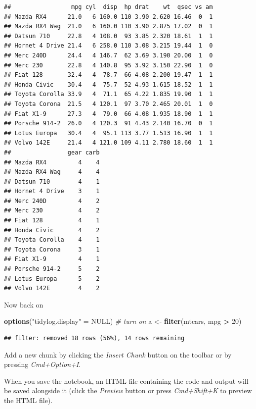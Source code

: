 \documentclass[
]{book}
\newenvironment{Shaded}{\begin{snugshade}}{\end{snugshade}}
\newcommand{\CommentTok}[1]{\textcolor[rgb]{0.56,0.35,0.01}{\textit{#1}}}
\newcommand{\DecValTok}[1]{\textcolor[rgb]{0.00,0.00,0.81}{#1}}
\newcommand{\KeywordTok}[1]{\textcolor[rgb]{0.13,0.29,0.53}{\textbf{#1}}}
\newcommand{\NormalTok}[1]{#1}
\newcommand{\OperatorTok}[1]{\textcolor[rgb]{0.81,0.36,0.00}{\textbf{#1}}}
\newcommand{\OtherTok}[1]{\textcolor[rgb]{0.56,0.35,0.01}{#1}}
\newcommand{\StringTok}[1]{\textcolor[rgb]{0.31,0.60,0.02}{#1}}
\begin{document}
\begin{verbatim}
##                 mpg cyl  disp  hp drat    wt  qsec vs am
## Mazda RX4      21.0   6 160.0 110 3.90 2.620 16.46  0  1
## Mazda RX4 Wag  21.0   6 160.0 110 3.90 2.875 17.02  0  1
## Datsun 710     22.8   4 108.0  93 3.85 2.320 18.61  1  1
## Hornet 4 Drive 21.4   6 258.0 110 3.08 3.215 19.44  1  0
## Merc 240D      24.4   4 146.7  62 3.69 3.190 20.00  1  0
## Merc 230       22.8   4 140.8  95 3.92 3.150 22.90  1  0
## Fiat 128       32.4   4  78.7  66 4.08 2.200 19.47  1  1
## Honda Civic    30.4   4  75.7  52 4.93 1.615 18.52  1  1
## Toyota Corolla 33.9   4  71.1  65 4.22 1.835 19.90  1  1
## Toyota Corona  21.5   4 120.1  97 3.70 2.465 20.01  1  0
## Fiat X1-9      27.3   4  79.0  66 4.08 1.935 18.90  1  1
## Porsche 914-2  26.0   4 120.3  91 4.43 2.140 16.70  0  1
## Lotus Europa   30.4   4  95.1 113 3.77 1.513 16.90  1  1
## Volvo 142E     21.4   4 121.0 109 4.11 2.780 18.60  1  1
##                gear carb
## Mazda RX4         4    4
## Mazda RX4 Wag     4    4
## Datsun 710        4    1
## Hornet 4 Drive    3    1
## Merc 240D         4    2
## Merc 230          4    2
## Fiat 128          4    1
## Honda Civic       4    2
## Toyota Corolla    4    1
## Toyota Corona     3    1
## Fiat X1-9         4    1
## Porsche 914-2     5    2
## Lotus Europa      5    2
## Volvo 142E        4    2
\end{verbatim}

Now back on

\begin{Shaded}
\begin{Highlighting}[]
\KeywordTok{options}\NormalTok{(}\StringTok{"tidylog.display"}\NormalTok{ =}\StringTok{ }\OtherTok{NULL}\NormalTok{)    }\CommentTok{# turn on}
\NormalTok{a <-}\StringTok{ }\KeywordTok{filter}\NormalTok{(mtcars, mpg }\OperatorTok{>}\StringTok{ }\DecValTok{20}\NormalTok{)}
\end{Highlighting}
\end{Shaded}

\begin{verbatim}
## filter: removed 18 rows (56%), 14 rows remaining
\end{verbatim}

Add a new chunk by clicking the \emph{Insert Chunk} button on the toolbar or by pressing \emph{Cmd+Option+I}.

When you save the notebook, an HTML file containing the code and output will be saved alongside it (click the \emph{Preview} button or press \emph{Cmd+Shift+K} to preview the HTML file).
\end{document}
